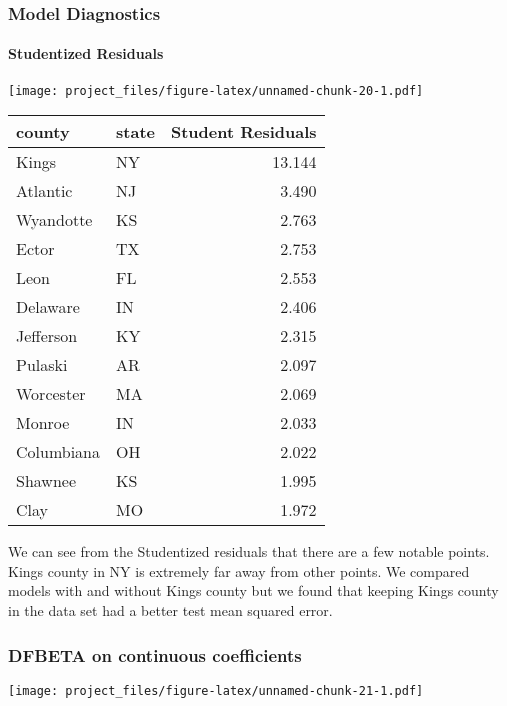 \documentclass[]{article}
\let\oldparagraph\paragraph
\renewcommand{\paragraph}[1]{\oldparagraph{#1}\mbox{}}
\begin{document}
\subsubsection{Model Diagnostics}\label{model-diagnostics}

\paragraph{Studentized Residuals}\label{studentized-residuals}

\texttt{[image: project\_files/figure-latex/unnamed-chunk-20-1.pdf]}

\begin{longtable}[]{@{}llr@{}}
\toprule
county & state & Student Residuals\tabularnewline
\midrule
\endhead
Kings & NY & 13.144\tabularnewline
Atlantic & NJ & 3.490\tabularnewline
Wyandotte & KS & 2.763\tabularnewline
Ector & TX & 2.753\tabularnewline
Leon & FL & 2.553\tabularnewline
Delaware & IN & 2.406\tabularnewline
Jefferson & KY & 2.315\tabularnewline
Pulaski & AR & 2.097\tabularnewline
Worcester & MA & 2.069\tabularnewline
Monroe & IN & 2.033\tabularnewline
Columbiana & OH & 2.022\tabularnewline
Shawnee & KS & 1.995\tabularnewline
Clay & MO & 1.972\tabularnewline
\bottomrule
\end{longtable}

We can see from the Studentized residuals that there are a few notable
points. Kings county in NY is extremely far away from other points. We
compared models with and without Kings county but we found that keeping
Kings county in the data set had a better test mean squared error.

\subsubsection{DFBETA on continuous
coefficients}\label{dfbeta-on-continuous-coefficients}

\texttt{[image: project\_files/figure-latex/unnamed-chunk-21-1.pdf]}
\end{document}
